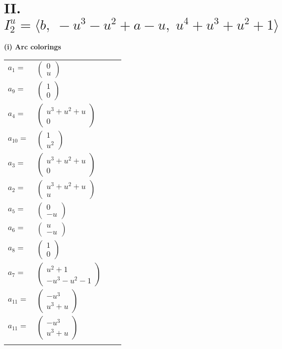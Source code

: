 \documentclass[1p]{elsarticle_modified}
\theoremstyle{definition}
\begin{document}
\centering \section*{II. $I^u_{2}= \langle b,\;- u^3- u^2+a- u,\;u^4+u^3+u^2+1 \rangle$}
\flushleft \textbf{(i) Arc colorings}\\
\begin{tabular}{m{7pt} m{180pt} m{7pt} m{180pt} }
\flushright $a_{1}=$&$\begin{pmatrix}0\\u\end{pmatrix}$ \\
\flushright $a_{9}=$&$\begin{pmatrix}1\\0\end{pmatrix}$ \\
\flushright $a_{4}=$&$\begin{pmatrix}u^3+u^2+u\\0\end{pmatrix}$ \\
\flushright $a_{10}=$&$\begin{pmatrix}1\\u^2\end{pmatrix}$ \\
\flushright $a_{3}=$&$\begin{pmatrix}u^3+u^2+u\\0\end{pmatrix}$ \\
\flushright $a_{2}=$&$\begin{pmatrix}u^3+u^2+u\\u\end{pmatrix}$ \\
\flushright $a_{5}=$&$\begin{pmatrix}0\\- u\end{pmatrix}$ \\
\flushright $a_{6}=$&$\begin{pmatrix}u\\- u\end{pmatrix}$ \\
\flushright $a_{8}=$&$\begin{pmatrix}1\\0\end{pmatrix}$ \\
\flushright $a_{7}=$&$\begin{pmatrix}u^2+1\\- u^3- u^2-1\end{pmatrix}$ \\
\flushright $a_{11}=$&$\begin{pmatrix}- u^3\\u^3+u\end{pmatrix}$\\ \flushright $a_{11}=$&$\begin{pmatrix}- u^3\\u^3+u\end{pmatrix}$\\&\end{tabular}
\end{document}
